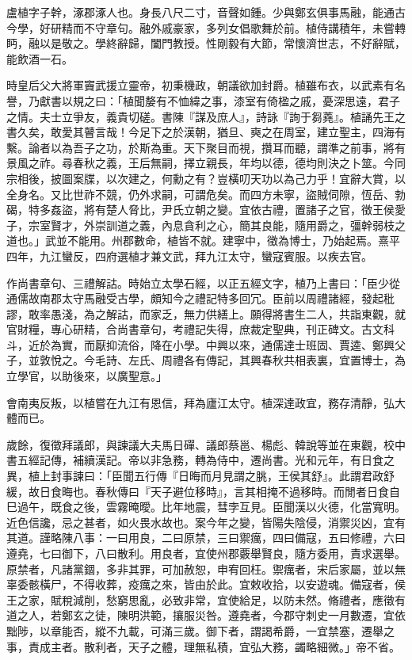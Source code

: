 \begin{pinyinscope}
盧植字子幹，涿郡涿人也。身長八尺二寸，音聲如鍾。少與鄭玄俱事馬融，能通古今學，好研精而不守章句。融外戚豪家，多列女倡歌舞於前。植侍講積年，未嘗轉眄，融以是敬之。學終辭歸，闔門教授。性剛毅有大節，常懷濟世志，不好辭賦，能飲酒一石。

時皇后父大將軍竇武援立靈帝，初秉機政，朝議欲加封爵。植雖布衣，以武素有名譽，乃獻書以規之曰：「植聞嫠有不恤緯之事，漆室有倚楹之戚，憂深思遠，君子之情。夫士立爭友，義貴切磋。書陳『謀及庶人』，詩詠『詢于芻蕘』。植誦先王之書久矣，敢愛其瞽言哉！今足下之於漢朝，猶旦、奭之在周室，建立聖主，四海有繫。論者以為吾子之功，於斯為重。天下聚目而視，攢耳而聽，謂準之前事，將有景風之祚。尋春秋之義，王后無嗣，擇立親長，年均以德，德均則決之卜筮。今同宗相後，披圖案牒，以次建之，何勳之有？豈橫叨天功以為己力乎！宜辭大賞，以全身名。又比世祚不競，仍外求嗣，可謂危矣。而四方未寧，盜賊伺隙，恆岳、勃碣，特多姦盜，將有楚人脅比，尹氏立朝之變。宜依古禮，置諸子之官，徵王侯愛子，宗室賢才，外崇訓道之義，內息貪利之心，簡其良能，隨用爵之，彊幹弱枝之道也。」武並不能用。州郡數命，植皆不就。建寧中，徵為博士，乃始起焉。熹平四年，九江蠻反，四府選植才兼文武，拜九江太守，蠻寇賓服。以疾去官。

作尚書章句、三禮解詁。時始立太學石經，以正五經文字，植乃上書曰：「臣少從通儒故南郡太守馬融受古學，頗知今之禮記特多回冗。臣前以周禮諸經，發起秕謬，敢率愚淺，為之解詁，而家乏，無力供繕上。願得將書生二人，共詣東觀，就官財糧，專心研精，合尚書章句，考禮記失得，庶裁定聖典，刊正碑文。古文科斗，近於為實，而厭抑流俗，降在小學。中興以來，通儒達士班固、賈逵、鄭興父子，並敦悅之。今毛詩、左氏、周禮各有傳記，其興春秋共相表裏，宜置博士，為立學官，以助後來，以廣聖意。」

會南夷反叛，以植嘗在九江有恩信，拜為廬江太守。植深達政宜，務存清靜，弘大體而已。

歲餘，復徵拜議郎，與諫議大夫馬日磾、議郎蔡邕、楊彪、韓說等並在東觀，校中書五經記傳，補續漢記。帝以非急務，轉為侍中，遷尚書。光和元年，有日食之異，植上封事諫曰：「臣聞五行傳『日晦而月見謂之朓，王侯其舒』。此謂君政舒緩，故日食晦也。春秋傳曰『天子避位移時』，言其相掩不過移時。而閒者日食自巳過午，既食之後，雲霧晻曖。比年地震，彗孛互見。臣聞漢以火德，化當寬明。近色信讒，忌之甚者，如火畏水故也。案今年之變，皆陽失陰侵，消禦災凶，宜有其道。謹略陳八事：一曰用良，二曰原禁，三曰禦癘，四曰備寇，五曰修禮，六曰遵堯，七曰御下，八曰散利。用良者，宜使州郡覈舉賢良，隨方委用，責求選舉。原禁者，凡諸黨錮，多非其罪，可加赦恕，申宥回枉。禦癘者，宋后家屬，並以無辜委骸橫尸，不得收葬，疫癘之來，皆由於此。宜敕收拾，以安遊魂。備寇者，侯王之家，賦稅減削，愁窮思亂，必致非常，宜使給足，以防未然。脩禮者，應徵有道之人，若鄭玄之徒，陳明洪範，攘服災咎。遵堯者，今郡守刺史一月數遷，宜依黜陟，以章能否，縱不九載，可滿三歲。御下者，謂謁希爵，一宜禁塞，遷舉之事，責成主者。散利者，天子之體，理無私積，宜弘大務，蠲略細微。」帝不省。


\end{pinyinscope}

